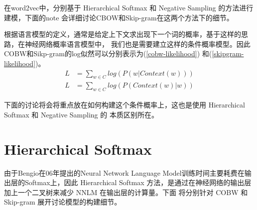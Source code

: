 \documentclass[UTF8]{ctexart}
\begin{document}
\par
在word2vec中，分别基于 Hierarchical Softmax 和 Negative Sampling 的方法进行建模，下面的note
会详细讨论CBOW和Skip-gram在这两个方法下的细节。
\par
根据语言模型的定义，通常是给定上下文求出现下一个词的概率，基于这样的思路，在神经网络概率语言模型中，
我们也是需要建立这样的条件概率模型。因此COBW和Sikp-gram的log似然可以分别表示为(\ref{cobw-likelihood})
和(\ref{skipgram-likelihood})。
\begin{align}
\label{cobw-likelihood}
L &= \sum_{w \in C} log(P(w|Context(w)))
\\
\label{skipgram-likelihood}
L &= \sum_{w \in C} log(P(Context(w) | w)) 
\end{align}

\par
下面的讨论将会将重点放在如何构建这个条件概率上，这也是使用 Hierarchical Softmax 和 Negative Sampling 的
本质区别所在。

\section{Hierarchical Softmax}
由于Bengio在06年提出的Neural Network Language Model训练时间主要耗费在输出层的Softmax上，因此
Hierarchical Softmax 方法，是通过在神经网络的输出层加上一个二叉树来减少 NNLM 在输出层的计算量。下面
将分别针对 COBW 和 Skip-gram 展开讨论模型的构建细节。
\end{document}
